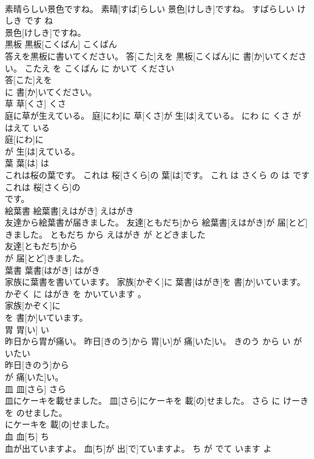 \documentclass[8pt]{extreport}
\begin{document}
\begin{CJK}{UTF8}{min}
\\	素晴らしい景色ですね。	素晴[すば]らしい 景色[けしき]ですね。	すばらしい けしき です ね	
\\	景色[けしき]ですね。			
\\	黒板	黒板[こくばん]	こくばん	
\\	答えを黒板に書いてください。	答[こた]えを 黒板[こくばん]に 書[か]いてください。	こたえ を こくばん に かいて ください	
\\	答[こた]えを
\\	に 書[か]いてください。			
\\	草	草[くさ]	くさ	
\\	庭に草が生えている。	庭[にわ]に 草[くさ]が 生[は]えている。	にわ に くさ が はえて いる	
\\	庭[にわ]に
\\	が 生[は]えている。			
\\	葉	葉[は]	は	
\\	これは桜の葉です。	これは 桜[さくら]の 葉[は]です。	これ は さくら の は です	
\\	これは 桜[さくら]の
\\	です。			
\\	絵葉書	絵葉書[えはがき]	えはがき	
\\	友達から絵葉書が届きました。	友達[ともだち]から 絵葉書[えはがき]が 届[とど]きました。	ともだち から えはがき が とどきました	
\\	友達[ともだち]から
\\	が 届[とど]きました。			
\\	葉書	葉書[はがき]	はがき	
\\	家族に葉書を書いています。	家族[かぞく]に 葉書[はがき]を 書[か]いています。	かぞく に はがき を かいています 。	
\\	家族[かぞく]に
\\	を 書[か]いています。			
\\	胃	胃[い]	い	
\\	昨日から胃が痛い。	昨日[きのう]から 胃[い]が 痛[いた]い。	きのう から い が いたい	
\\	昨日[きのう]から
\\	が 痛[いた]い。			
\\	皿	皿[さら]	さら	
\\	皿にケーキを載せました。	皿[さら]にケーキを 載[の]せました。	さら に けーき を のせました。	
\\	にケーキを 載[の]せました。			
\\	血	血[ち]	ち	
\\	血が出ていますよ。	血[ち]が 出[で]ていますよ。	ち が でて います よ	

\end{CJK}
\end{document}
